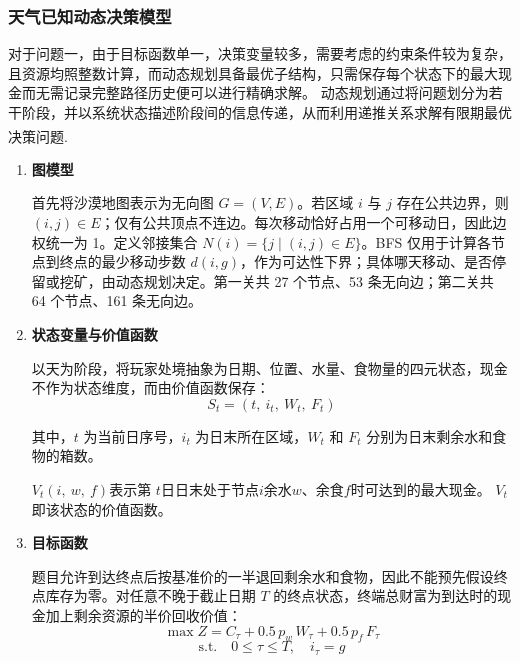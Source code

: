 \documentclass{cumcmthesis}
\numberwithin{equation}{section}
\numberwithin{figure}{section}
\numberwithin{table}{section}
\begin{document}
    \subsubsection{天气已知动态决策模型}

    对于问题一，由于目标函数单一，决策变量较多，需要考虑的约束条件较为复杂，且资源均照整数计算，而动态规划具备最优子结构，只需保存每个状态下的最大现金而无需记录完整路径历史便可以进行精确求解。
    动态规划通过将问题划分为若干阶段，并以系统状态描述阶段间的信息传递，从而利用递推关系求解有限期最优决策问题\textsuperscript{\cite{jiangqiyuan2018,heyichao2016}}.
    
    \begin{enumerate}
        \item\textbf{图模型}
        
        
        \hspace*{2em}首先将沙漠地图表示为无向图 $G=(V,E)$。若区域 $i$ 与 $j$ 存在公共边界，则 $(i,j)\in E$；仅有公共顶点不连边。每次移动恰好占用一个可移动日，因此边权统一为 1。定义邻接集合 $N(i)=\{j\mid (i,j)\in E\}$。BFS 仅用于计算各节点到终点的最少移动步数 $d(i,g)$，作为可达性下界；具体哪天移动、是否停留或挖矿，由动态规划决定。第一关共 27 个节点、53 条无向边；第二关共 64 个节点、161 条无向边。

        \item\textbf{状态变量与价值函数}
        
\hspace*{2em}以天为阶段，将玩家处境抽象为日期、位置、水量、食物量的四元状态，现金不作为状态维度，而由价值函数保存：
\vspace{-10pt}
\begin{equation}
S_t = (t,\ i_t,\ W_t,\ F_t)
\label{eq:q1_state}
\end{equation}

\hspace*{2em}其中，$t$ 为当前日序号，$i_t$ 为日末所在区域，$W_t$ 和 $F_t$ 分别为日末剩余水和食物的箱数。


\hspace*{2em}$V_t(i,\ w,\ f) $表示第 $t$日日末处于节点$i$余水$w$、余食$f$时可达到的最大现金。
$V_t$ 即该状态的价值函数。

        \item\textbf{目标函数}
        
        \hspace*{2em}
        题目允许到达终点后按基准价的一半退回剩余水和食物，因此不能预先假设终点库存为零。对任意不晚于截止日期 $T$ 的终点状态，终端总财富为到达时的现金加上剩余资源的半价回收价值：
\vspace{-10pt}
\begin{equation}
\max Z = C_\tau + 0.5\,p_w\,W_\tau + 0.5\,p_f\,F_\tau
\label{eq:q1_obj}
\end{equation}
\vspace{-18pt}
\begin{equation}
\text{s.t.}\quad 0 \leq \tau \leq T,\quad i_\tau = g
\label{eq:q1_objcon}
\end{equation}


\end{enumerate}
\end{document}
